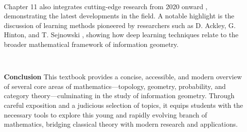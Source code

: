 \,

Chapter 11 also integrates cutting-edge research from 2020 onward \cite{CoMa,CoCoNen}, demonstrating the latest developments in the field. A notable highlight is the discussion of learning methods pioneered by researchers such as D. Ackley, G. Hinton, and T. Sejnowski \cite{AHS}, showing how deep learning techniques relate to the broader mathematical framework of information geometry.

\,

{\bf  Conclusion}
This textbook provides a concise, accessible, and modern overview of several core areas of mathematics—topology, geometry, probability, and category theory—culminating in the study of information geometry. Through careful exposition and a judicious selection of topics, it equips students with the necessary tools to explore this young and rapidly evolving branch of mathematics, bridging classical theory with modern research and applications.






